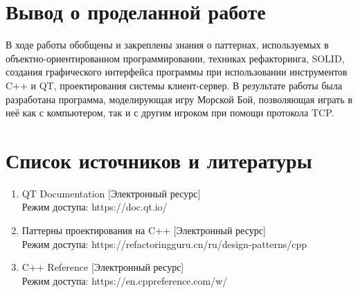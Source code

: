 \documentclass[a4paper,14pt]{extarticle}
\begin{document}
\section{Вывод о проделанной работе}
В ходе работы обобщены и закреплены знания о паттернах, используемых в объектно-ориентированном программировании,
техниках рефакторинга, SOLID, создания графического интерфейса программы при использовании инструментов C++ и QT, 
проектирования системы клиент-сервер. В результате работы была разработана программа, моделирующая игру Морской Бой,
позволяющая играть в неё как с компьютером, так и с другим игроком при помощи протокола TCP. 
\newpage

\section{Список источников и литературы}
\begin{enumerate}
    \item QT Documentation [Электронный ресурс] \\Режим доступа: https://doc.qt.io/
    \item Паттерны проектирования на C++ [Электронный ресурс] \\Режим доступа: https://refactoringguru.cn/ru/design-patterns/cpp
    \item C++ Reference [Электронный ресурс] \\Режим доступа: https://en.cppreference.com/w/
\end{enumerate}
\end{document}

